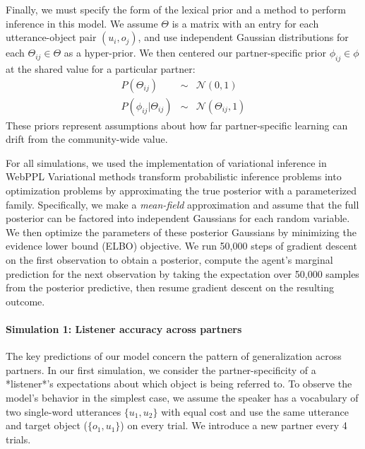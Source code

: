 Finally, we must specify the form of the lexical prior and a method to perform inference in this model.
We assume $\Theta$ is a matrix with an entry for each utterance-object pair $(u_i, o_j)$, and use independent Gaussian distributions for each $\Theta_{ij} \in \Theta$ as a hyper-prior.
We then centered our partner-specific prior $\phi_{ij} \in \phi$ at the shared value for a particular partner:
$$\begin{array}{rcl}
P(\Theta_{ij}) & \sim & \mathcal{N}(0, 1)\\
P(\phi_{ij} | \Theta_{ij}) & \sim & \mathcal{N}(\Theta_{ij}, 1)
\end{array}$$
These priors represent assumptions about how far partner-specific learning can drift from the community-wide value.

For all simulations, we used the implementation of variational inference in WebPPL \cite{GoodmanStuhlmuller14_DIPPL}
Variational methods transform probabilistic inference problems into optimization problems by approximating the true posterior with a parameterized family.
Specifically, we make a \emph{mean-field} approximation and assume that the full posterior can be factored into independent Gaussians for each random variable. 
We then optimize the parameters of these posterior Gaussians by minimizing the evidence lower bound (ELBO) objective.
We run 50,000 steps of gradient descent on the first observation to obtain a posterior, compute the agent's marginal prediction for the next observation by taking the expectation over 50,000 samples from the posterior predictive, then resume gradient descent on the resulting outcome.

\paragraph{Simulation 1: Listener accuracy across partners}

The key predictions of our model concern the pattern of generalization across partners.
In our first simulation, we consider the partner-specificity of a *listener*'s expectations about which object is being referred to.
To observe the model's behavior in the simplest case, we assume the speaker has a vocabulary of two single-word utterances $\{u_1, u_2\}$ with equal cost and use the same utterance and target object ($\{o_1, u_1\}$) on every trial.
We introduce a new partner every 4 trials.

